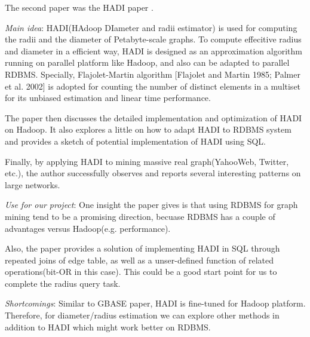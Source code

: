 The second paper was the HADI paper \cite{Kang:2011:HMR:1921632.1921634}.
\begin{itemize*}
\item {\em Main idea}:
	   HADI(HAdoop DIameter and radii estimator) is used for computing the radii and the diameter of Petabyte-scale graphs. To compute effecitive radius and diameter in a efficient way, HADI is designed as an approximation algorithm running on parallel platform like Hadoop, and also can be adapted to parallel RDBMS. Specially, Flajolet-Martin algorithm [Flajolet and Martin 1985; Palmer et al. 2002] is adopted for counting the number of distinct elements in a multiset for its unbiased estimation and linear time performance.

	   The paper then discusses the detailed implementation and optimization of HADI on Hadoop. It also explores a little on how to adapt HADI to RDBMS system and provides a sketch of potential implementation of HADI using SQL.

	   Finally, by applying HADI to mining massive real graph(YahooWeb, Twitter, etc.), the author successfully observes and reports several interesting patterns on large networks. 
\item {\em Use for our project}:
	   One insight the paper gives is that using RDBMS for graph mining tend to be a promising direction, becuase RDBMS has a couple of advantages versus Hadoop(e.g. performance)\cite{pavlo09}. 

	   Also, the paper provides a solution of implementing HADI in SQL through repeated joins of edge table, as well as a unser-defined function of related operations(bit-OR in this case). This could be a good start point for us to complete the radius query task.
\item {\em Shortcomings}:
       Similar to GBASE paper, HADI is fine-tuned for Hadoop platform. Therefore, for diameter/radius estimation we can explore other methods in addition to HADI which might work better on RDBMS.      
\end{itemize*}

